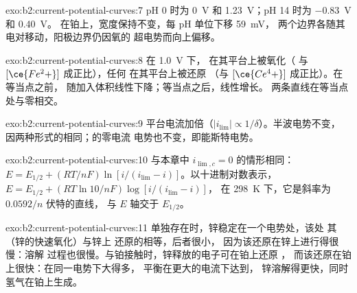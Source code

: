 \begin{solution}{exo:b2:current-potential-curves:7}
pH 0 时为 \qty{0}{V} 和 \qty{1.23}{V}；pH 14 时为 \qty{-0.83}{V} 和 \qty{0.40}{V}。
在铂上，宽度保持不变，每 pH 单位下移 \qty{59}{mV}，
两个边界各随其电对移动，阳极边界仍因氧的
超电势而向上偏移。
\end{solution}

\begin{solution}{exo:b2:current-potential-curves:8}
在 \qty{1.0}{V} 下， 在其平台上被氧化（
与 $[\ce{Fe^2+}]$ 成正比），任何  在其平台上被还原
（与 $[\ce{Ce^4+}]$ 成正比）。在等当点之前，
随加入体积线性下降；等当点之后，线性增长。
两条直线在等当点处与零相交。
\end{solution}

\begin{solution}{exo:b2:current-potential-curves:9}
平台电流加倍（$|i_{\lim}| \propto 1/\delta$）。半波电势不变，
因两种形式的相同；的零电流
电势也不变，即能斯特电势。
\end{solution}

\begin{solution}{exo:b2:current-potential-curves:10}
与本章中 $i_{\lim,c} = 0$ 的情形相同：$E = E_{1/2} + (RT/nF)\ln[i/(i_{\lim} -
i)]$。以十进制对数表示，$E = E_{1/2} + (RT\ln 10/nF)\log[i/(i_{\lim} - i)]$，
在 \qty{298}{K} 下，它是斜率为 $0.0592/n$ 伏特的直线，
与 $E$ 轴交于 $E_{1/2}$。
\end{solution}

\begin{solution}{exo:b2:current-potential-curves:11}
单独存在时，锌稳定在一个电势处，该处
其（锌的快速氧化）与锌上  还原的相等，后者很小，
因为该还原在锌上进行得很慢：溶解
过程也很慢。与铂接触时，锌释放的电子可在铂上还原 ，
而该还原在铂上很快：在同一电势下大得多，
平衡在更大的电流下达到，
锌溶解得更快，同时氢气在铂上生成。
\end{solution}

